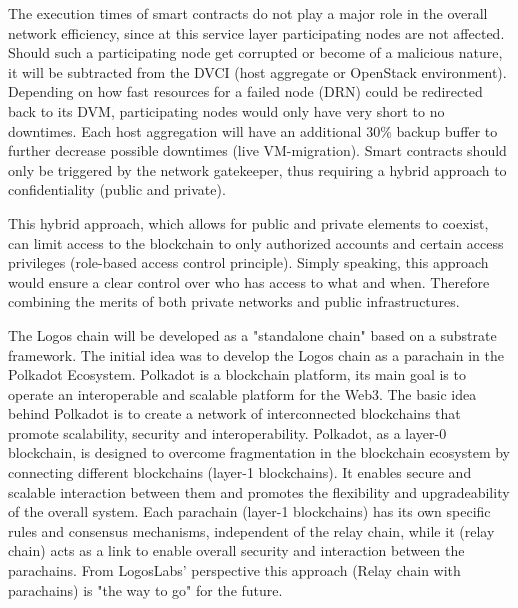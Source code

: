 \documentclass[]{article}
\begin{document}
The execution times of smart contracts do not play a major role in the overall network efficiency, since at this service layer participating nodes are not affected.
Should such a participating node get corrupted or become of a malicious nature, it will be subtracted from the DVCI (host aggregate or OpenStack environment).
Depending on how fast resources for a failed node (DRN) could be redirected back to its DVM, participating nodes would only have very short to no downtimes. 
Each host aggregation will have an additional 30\% backup buffer to further decrease possible downtimes (live VM-migration).
Smart contracts should only be triggered by the network gatekeeper, thus requiring a hybrid approach to confidentiality (public and private).

This hybrid approach, which allows for public and private elements to coexist, can limit access to the blockchain to only authorized accounts and certain access privileges (role-based access control principle).
Simply speaking, this approach would ensure a clear control over who has access to what and when.
Therefore combining the merits of both private networks and public infrastructures.

The Logos chain will be developed as a "standalone chain" based on a substrate framework.
The initial idea was to develop the Logos chain as a parachain in the Polkadot Ecosystem.
Polkadot is a blockchain platform, its main goal is to operate an interoperable and scalable platform for the Web3.
The basic idea behind Polkadot is to create a network of interconnected blockchains that promote scalability, security and interoperability.
Polkadot, as a layer-0 blockchain, is designed to overcome fragmentation in the blockchain ecosystem by connecting different blockchains (layer-1 blockchains). 
It enables secure and scalable interaction between them and promotes the flexibility and upgradeability of the overall system.
Each parachain \cite{PolkadotDoc-parachain} (layer-1 blockchains) has its own specific rules and consensus mechanisms, independent of the relay chain, while it (relay chain) acts as a link to enable overall security and interaction between the parachains.
From LogosLabs' perspective this approach (Relay chain with parachains) is "the way to go" for the future.
\end{document}
